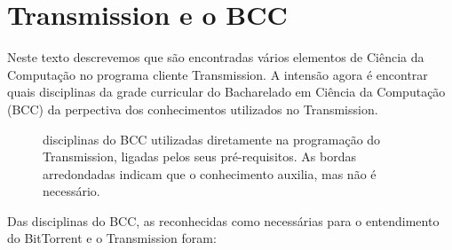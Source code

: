 
\chapter{Transmission e o BCC}
\label{chap:bcc}

Neste texto descrevemos que são encontradas vários elementos de Ciência da Computação no
programa cliente Transmission. A intensão agora é encontrar quais disciplinas da grade
curricular do Bacharelado em Ciência da Computação (BCC) da perpectiva dos conhecimentos
utilizados no Transmission.

\begin{figure}[H]
    \centering
    \caption{disciplinas do BCC utilizadas diretamente na programação do Transmission, ligadas pelos seus pré-requisitos. As bordas arredondadas indicam que o conhecimento auxilia, mas não é necessário.}
    \label{fig:bcc}
\end{figure}

Das disciplinas do BCC, as reconhecidas como necessárias para o entendimento do
BitTorrent e o Transmission foram:

